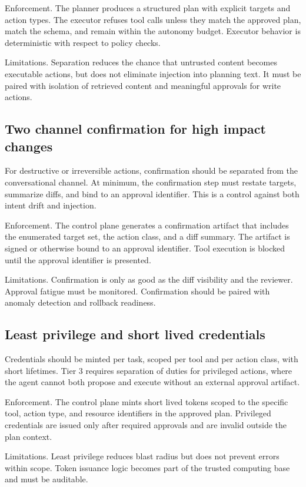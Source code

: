 \documentclass[11pt]{article}
\begin{document}
Enforcement. The planner produces a structured plan with explicit targets and action types. The executor refuses tool calls unless they match the approved plan, match the schema, and remain within the autonomy budget. Executor behavior is deterministic with respect to policy checks.

Limitations. Separation reduces the chance that untrusted content becomes executable actions, but does not eliminate injection into planning text. It must be paired with isolation of retrieved content and meaningful approvals for write actions.

\subsection{Two channel confirmation for high impact changes}
For destructive or irreversible actions, confirmation should be separated from the conversational channel. At minimum, the confirmation step must restate targets, summarize diffs, and bind to an approval identifier. This is a control against both intent drift and injection.

Enforcement. The control plane generates a confirmation artifact that includes the enumerated target set, the action class, and a diff summary. The artifact is signed or otherwise bound to an approval identifier. Tool execution is blocked until the approval identifier is presented.

Limitations. Confirmation is only as good as the diff visibility and the reviewer. Approval fatigue must be monitored. Confirmation should be paired with anomaly detection and rollback readiness.

\subsection{Least privilege and short lived credentials}
Credentials should be minted per task, scoped per tool and per action class, with short lifetimes. Tier 3 requires separation of duties for privileged actions, where the agent cannot both propose and execute without an external approval artifact.

Enforcement. The control plane mints short lived tokens scoped to the specific tool, action type, and resource identifiers in the approved plan. Privileged credentials are issued only after required approvals and are invalid outside the plan context.

Limitations. Least privilege reduces blast radius but does not prevent errors within scope. Token issuance logic becomes part of the trusted computing base and must be auditable.
\end{document}
